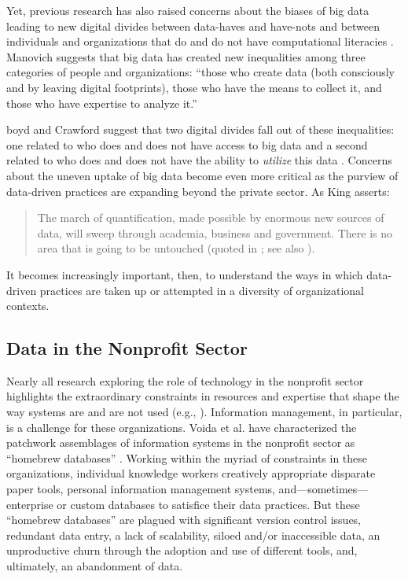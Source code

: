 Yet, previous research has also raised concerns about the biases of big data leading to new digital divides between data-haves and have-nots and between individuals and organizations that do and do not have computational literacies \citep{Boyd2012Critical,Kitchin2014Big,Manovich2011Trending}. Manovich suggests that big data has created new inequalities among three categories of people and organizations: “those who create data (both consciously and by leaving digital footprints), those who have the means to collect it, and those who have expertise to analyze it.” \citep{Manovich2011Trending}

boyd and Crawford suggest that two digital divides fall out of these inequalities: one related to who does and does not have access to big data and a second related to who does and does not have the ability to \textit{utilize} this data \citep{Boyd2012Critical}. Concerns about the uneven uptake of big data become even more critical as the purview of data-driven practices are expanding beyond the private sector. As King asserts:

\begin{quote}\singlespacing The march of quantification, made possible by enormous new sources of data, will sweep through academia, business and government. There is no area that is going to be untouched (quoted in \citep{Lohr2012Age}; see also \citep{Brynjolfsson2011Boom,Kitchin2014Big}).\end{quote}

It becomes increasingly important, then, to understand the ways in which data-driven practices are taken up or attempted in a diversity of organizational contexts.

\subsection{Data in the Nonprofit Sector}
Nearly all research exploring the role of technology in the nonprofit sector highlights the extraordinary constraints in resources and expertise that shape the way systems are and are not used (e.g., \cite{Merkel2007Learning,Voida2011Homebrew}). Information management, in particular, is a challenge for these organizations. Voida et al. have characterized the patchwork assemblages of information systems in the nonprofit sector as “homebrew databases” \citep{Voida2011Homebrew}. Working within the myriad of constraints in these organizations, individual knowledge workers creatively appropriate disparate paper tools, personal information management systems, and---sometimes---enterprise or custom databases to satisfice their data practices. But these “homebrew databases” are plagued with significant version control issues, redundant data entry, a lack of scalability, siloed and/or inaccessible data, an unproductive churn through the adoption and use of different tools, and, ultimately, an abandonment of data. 

